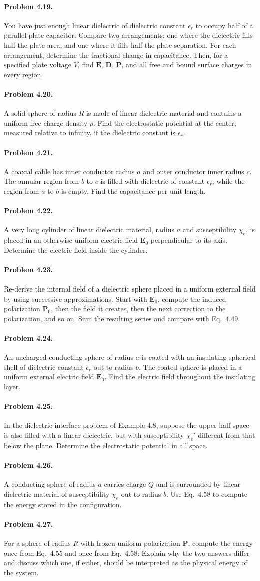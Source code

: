 \documentclass{aa}
\newcommand{\problemstatement}[2]{%
\paragraph{Problem #1.}#2\par\medskip
}
\begin{document}
\problemstatement{4.19}{You have just enough linear dielectric of dielectric constant \(\epsilon_r\) to occupy half of a parallel-plate capacitor. Compare two arrangements: one where the dielectric fills half the plate area, and one where it fills half the plate separation. For each arrangement, determine the fractional change in capacitance. Then, for a specified plate voltage \(V\), find \(\mathbf E\), \(\mathbf D\), \(\mathbf P\), and all free and bound surface charges in every region.}
\problemstatement{4.20}{A solid sphere of radius \(R\) is made of linear dielectric material and contains a uniform free charge density \(\rho\). Find the electrostatic potential at the center, measured relative to infinity, if the dielectric constant is \(\epsilon_r\).}
\problemstatement{4.21}{A coaxial cable has inner conductor radius \(a\) and outer conductor inner radius \(c\). The annular region from \(b\) to \(c\) is filled with dielectric of constant \(\epsilon_r\), while the region from \(a\) to \(b\) is empty. Find the capacitance per unit length.}
\problemstatement{4.22}{A very long cylinder of linear dielectric material, radius \(a\) and susceptibility \(\chi_e\), is placed in an otherwise uniform electric field \(\mathbf E_0\) perpendicular to its axis. Determine the electric field inside the cylinder.}
\problemstatement{4.23}{Re-derive the internal field of a dielectric sphere placed in a uniform external field by using successive approximations. Start with \(\mathbf E_0\), compute the induced polarization \(\mathbf P_0\), then the field it creates, then the next correction to the polarization, and so on. Sum the resulting series and compare with Eq.~4.49.}
\problemstatement{4.24}{An uncharged conducting sphere of radius \(a\) is coated with an insulating spherical shell of dielectric constant \(\epsilon_r\) out to radius \(b\). The coated sphere is placed in a uniform external electric field \(\mathbf E_0\). Find the electric field throughout the insulating layer.}
\problemstatement{4.25}{In the dielectric-interface problem of Example 4.8, suppose the upper half-space is also filled with a linear dielectric, but with susceptibility \(\chi_e'\) different from that below the plane. Determine the electrostatic potential in all space.}
\problemstatement{4.26}{A conducting sphere of radius \(a\) carries charge \(Q\) and is surrounded by linear dielectric material of susceptibility \(\chi_e\) out to radius \(b\). Use Eq.~4.58 to compute the energy stored in the configuration.}
\problemstatement{4.27}{For a sphere of radius \(R\) with frozen uniform polarization \(\mathbf P\), compute the energy once from Eq.~4.55 and once from Eq.~4.58. Explain why the two answers differ and discuss which one, if either, should be interpreted as the physical energy of the system.}
\end{document}

